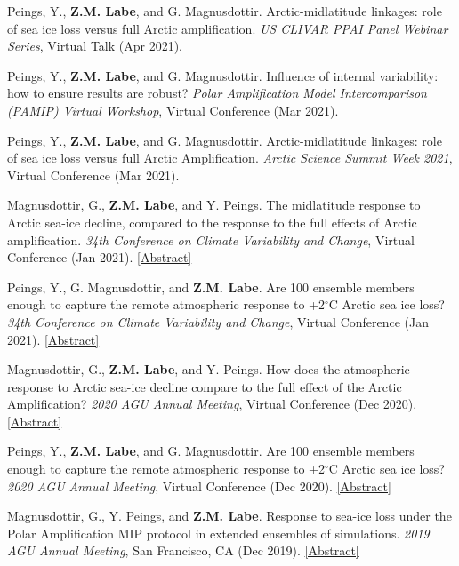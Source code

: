 \documentclass[margin,line,palatino,courier,10pt]{res}
\begin{document}
\begin{resume}
\begin{etaremune}[leftmargin=0in,topsep=0in,parsep=0in]
\item Peings, Y., \textbf{Z.M. Labe}, and G. Magnusdottir. Arctic-midlatitude linkages: role of sea ice loss versus full Arctic amplification. \textit{US CLIVAR PPAI Panel Webinar Series}, Virtual Talk (Apr 2021).
\item Peings, Y., \textbf{Z.M. Labe}, and G. Magnusdottir. Influence of internal variability: how to ensure results are robust? \textit{Polar Amplification Model Intercomparison (PAMIP) Virtual Workshop}, Virtual Conference (Mar 2021).
\item Peings, Y., \textbf{Z.M. Labe}, and G. Magnusdottir. Arctic-midlatitude linkages: role of sea ice loss versus full Arctic Amplification. \textit{Arctic Science Summit Week 2021}, Virtual Conference (Mar 2021).
\item Magnusdottir, G., \textbf{Z.M. Labe}, and Y. Peings. The midlatitude response to Arctic sea-ice decline, compared to the response to the full effects of Arctic amplification. \textit{34th Conference on Climate Variability and Change}, Virtual Conference (Jan 2021). \href{https://ams.confex.com/ams/101ANNUAL/meetingapp.cgi/Paper/382356}{[Abstract]}
\item Peings, Y., G. Magnusdottir, and \textbf{Z.M. Labe}. Are 100 ensemble members enough to capture the remote atmospheric response to +2$^{\circ}$C Arctic sea ice loss? \textit{34th Conference on Climate Variability and Change}, Virtual Conference (Jan 2021). \href{https://ams.confex.com/ams/101ANNUAL/meetingapp.cgi/Paper/382352}{[Abstract]}
\item Magnusdottir, G., \textbf{Z.M. Labe}, and Y. Peings. How does the atmospheric response to Arctic sea-ice decline compare to the full effect of the Arctic Amplification? \textit{2020 AGU Annual Meeting}, Virtual Conference (Dec 2020). \href{https://agu.confex.com/agu/fm20/meetingapp.cgi/Paper/678706}{[Abstract]}
\item Peings, Y., \textbf{Z.M. Labe}, and G. Magnusdottir. Are 100 ensemble members enough to capture the remote atmospheric response to +2$^{\circ}$C Arctic sea ice loss? \textit{2020 AGU Annual Meeting}, Virtual Conference (Dec 2020). \href{https://agu.confex.com/agu/fm20/meetingapp.cgi/Paper/685885}{[Abstract]}
\item Magnusdottir, G., Y. Peings, and \textbf{Z.M. Labe}. Response to sea-ice loss under the Polar Amplification MIP protocol in extended ensembles of simulations. \textit{2019 AGU Annual Meeting}, San Francisco, CA (Dec 2019). \href{https://agu.confex.com/agu/fm19/meetingapp.cgi/Paper/553470}{[Abstract]}

\end{etaremune}
\end{resume}
\end{document}
